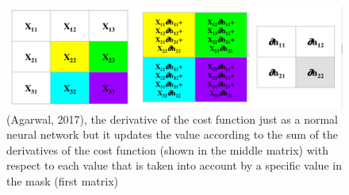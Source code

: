 \begin{figure}[ht]
	\includegraphics[width=\textwidth]{fig11.png} 
	\caption{(Agarwal, 2017), the derivative of the cost function just as a normal neural network but it updates the value according to the sum of the derivatives of the cost function (shown in the middle matrix) with respect to each value that is taken into account by a specific value in the mask (first matrix)}
\end{figure}

